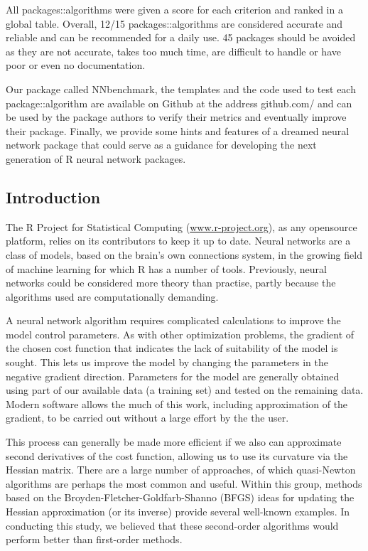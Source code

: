 All packages::algorithms were given a score for each criterion and
ranked in a global table. Overall, 12/15 packages::algorithms are
considered accurate and reliable and can be recommended for a daily use.
45 packages should be avoided as they are not accurate, takes too much
time, are difficult to handle or have poor or even no documentation.

Our package called NNbenchmark, the templates and the code used to test
each package::algorithm are available on Github at the address
github.com/ and can be used by the package authors to verify their
metrics and eventually improve their package. Finally, we provide some
hints and features of a dreamed neural network package that could serve
as a guidance for developing the next generation of R neural network
packages.

\hypertarget{introduction}{%
\subsection{Introduction}\label{introduction}}

The R Project for Statistical Computing (\url{www.r-project.org}), as
any opensource platform, relies on its contributors to keep it up to
date. Neural networks are a class of models, based on the brain's own
connections system, in the growing field of machine learning for which R
has a number of tools. Previously, neural networks could be considered
more theory than practise, partly because the algorithms used are
computationally demanding.

A neural network algorithm requires complicated calculations to improve
the model control parameters. As with other optimization problems, the
gradient of the chosen cost function that indicates the lack of
suitability of the model is sought. This lets us improve the model by
changing the parameters in the negative gradient direction. Parameters
for the model are generally obtained using part of our available data (a
training set) and tested on the remaining data. Modern software allows
the much of this work, including approximation of the gradient, to be
carried out without a large effort by the the user.

This process can generally be made more efficient if we also can
approximate second derivatives of the cost function, allowing us to use
its curvature via the Hessian matrix. There are a large number of
approaches, of which quasi-Newton algorithms are perhaps the most common
and useful. Within this group, methods based on the
Broyden-Fletcher-Goldfarb-Shanno (BFGS) ideas for updating the Hessian
approximation (or its inverse) provide several well-known examples. In
conducting this study, we believed that these second-order algorithms
would perform better than first-order methods.

